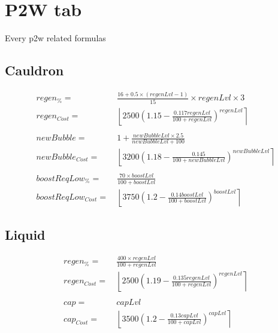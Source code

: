     \newpage
    \section{P2W tab}\label{sec:p2w}
        Every p2w related formulas
        \subsection{Cauldron}
            \begin{align*}
                regen_\% = &\ \frac{16 + 0.5 \times (regenLvl-1)}{15} \times regenLvl \times 3
                \\ 
                regen_{Cost} = &\ 
                    \left\lfloor 
                        2500\left(1.15-\frac{0.117regenLvl}{100+regenLvl}\right)^{regenLvl}
                    \right\rceil 
                \\ 
                \\
                newBubble = &\ 1 + \frac{newBubbleLvl \times 2.5}{newBubbleLvl + 100}
                \\
                newBubble_{Cost} = &\ 
                    \left\lfloor 
                        3200\left(1.18-\frac{0.145}{100+newBubbleLvl}\right)^{newBubbleLvl}
                    \right\rceil 
                \\
                \\
                boostReqLow_\% = &\  \frac{70 \times boostLvl}{100+boostLvl}
                \\
                boostReqLow_{Cost} = &\ 
                    \left\lfloor 
                        3750\left(1.2-\frac{0.14boostLvl}{100+boostLvl}\right)^{boostLvl}
                    \right\rceil 
            \end{align*}
        
        \newpage
        \subsection{Liquid}
            \begin{align*}
                regen_\% = &\  \frac{400 \times regenLvl}{100+regenLvl}
                \\ 
                regen_{Cost} = &\ 
                    \left\lfloor 
                        2500\left(1.19-\frac{0.135regenLvl}{100+regenLvl}\right)^{regenLvl}
                    \right\rceil 
                \\ 
                \\
                cap = &\ capLvl
                \\ 
                cap_{Cost} = &\ 
                    \left\lfloor 
                        3500\left(1.2-\frac{0.13capLvl}{100+capLvl}\right)^{capLvl}
                    \right\rceil 
            \end{align*}
